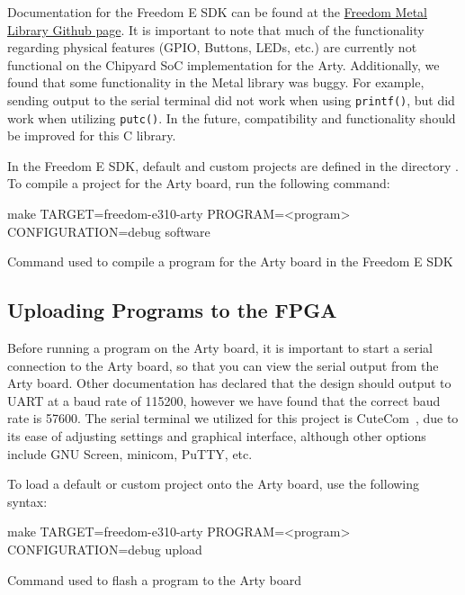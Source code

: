 Documentation for the Freedom E SDK can be found at the \href{https://sifive.github.io/freedom-metal-docs/}{Freedom Metal Library Github page}.
It is important to note that much of the functionality regarding physical features (GPIO, Buttons, LEDs, etc.) are currently not functional on the Chipyard SoC implementation for the Arty.
Additionally, we found that some functionality in the Metal library was buggy. 
For example, sending output to the serial terminal did not work when using \texttt{printf()}, but did work when utilizing \texttt{putc()}.
In the future, compatibility and functionality should be improved for this C library.

In the Freedom E SDK, default and custom projects are defined in the directory .
To compile a project for the Arty board, run the following command:

\begin{listing}[h!tbp]
  \begin{bashsource}
    make TARGET=freedom-e310-arty PROGRAM=<program> CONFIGURATION=debug software
  \end{bashsource}
  \caption{Command used to compile a program for the Arty board in the Freedom E SDK}
  \label{lst:compile_in_sdk}
\end{listing}

\subsection{Uploading Programs to the FPGA}\label{sec:Upload_Programs_to_Flashed_FPGA}
Before running a program on the Arty board, it is important to start a serial connection to the Arty board, so that you can view the serial output from the Arty board.
Other documentation has declared that the design should output to UART at a baud rate of 115200, however we have found that the correct baud rate is 57600.
The serial terminal we utilized for this project is CuteCom~\cite{CuteCom}, due to its ease of adjusting settings and graphical interface, although other options include GNU Screen, minicom, PuTTY, etc.

To load a default or custom project onto the Arty board, use the following syntax:

\begin{listing}[h!tbp]
  \begin{bashsource}
    make TARGET=freedom-e310-arty PROGRAM=<program> CONFIGURATION=debug upload
  \end{bashsource}
  \caption{Command used to flash a program to the Arty board}
  \label{lst:upload_to_arty}
\end{listing}

